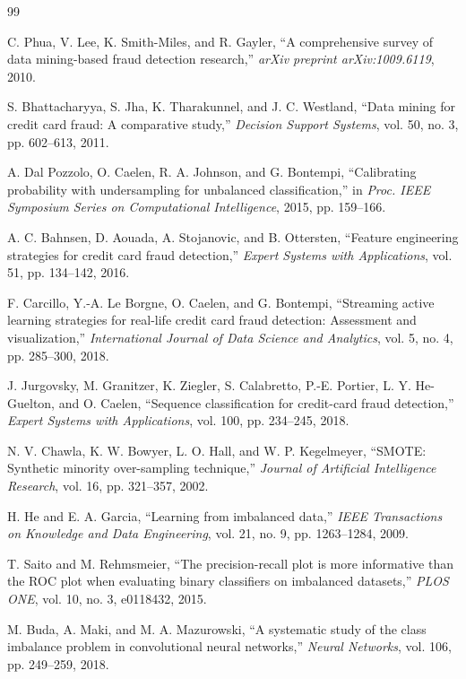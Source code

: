 \begin{thebibliography}{99}

C. Phua, V. Lee, K. Smith-Miles, and R. Gayler, ``A comprehensive survey of data mining-based fraud detection research,'' \textit{arXiv preprint arXiv:1009.6119}, 2010.

S. Bhattacharyya, S. Jha, K. Tharakunnel, and J. C. Westland, ``Data mining for credit card fraud: A comparative study,'' \textit{Decision Support Systems}, vol. 50, no. 3, pp. 602--613, 2011.

A. Dal Pozzolo, O. Caelen, R. A. Johnson, and G. Bontempi, ``Calibrating probability with undersampling for unbalanced classification,'' in \textit{Proc. IEEE Symposium Series on Computational Intelligence}, 2015, pp. 159--166.

A. C. Bahnsen, D. Aouada, A. Stojanovic, and B. Ottersten, ``Feature engineering strategies for credit card fraud detection,'' \textit{Expert Systems with Applications}, vol. 51, pp. 134--142, 2016.

F. Carcillo, Y.-A. Le Borgne, O. Caelen, and G. Bontempi, ``Streaming active learning strategies for real-life credit card fraud detection: Assessment and visualization,'' \textit{International Journal of Data Science and Analytics}, vol. 5, no. 4, pp. 285--300, 2018.

J. Jurgovsky, M. Granitzer, K. Ziegler, S. Calabretto, P.-E. Portier, L. Y. He-Guelton, and O. Caelen, ``Sequence classification for credit-card fraud detection,'' \textit{Expert Systems with Applications}, vol. 100, pp. 234--245, 2018.

N. V. Chawla, K. W. Bowyer, L. O. Hall, and W. P. Kegelmeyer, ``SMOTE: Synthetic minority over-sampling technique,'' \textit{Journal of Artificial Intelligence Research}, vol. 16, pp. 321--357, 2002.

H. He and E. A. Garcia, ``Learning from imbalanced data,'' \textit{IEEE Transactions on Knowledge and Data Engineering}, vol. 21, no. 9, pp. 1263--1284, 2009.

T. Saito and M. Rehmsmeier, ``The precision-recall plot is more informative than the ROC plot when evaluating binary classifiers on imbalanced datasets,'' \textit{PLOS ONE}, vol. 10, no. 3, e0118432, 2015.

M. Buda, A. Maki, and M. A. Mazurowski, ``A systematic study of the class imbalance problem in convolutional neural networks,'' \textit{Neural Networks}, vol. 106, pp. 249--259, 2018.


\end{thebibliography}
